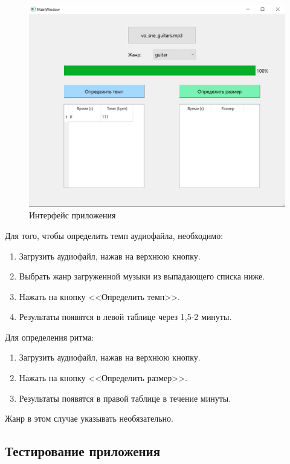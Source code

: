\begin{figure}[h]
	\centering
	\includegraphics[scale=0.6]{inc/img/gui.jpg}
	\caption{Интерфейс приложения}
	\label{img:gui}
\end{figure}

Для того, чтобы определить темп аудиофайла, необходимо:

\begin{enumerate}
	\item Загрузить аудиофайл, нажав на верхнюю кнопку.
	\item Выбрать жанр загруженной музыки из выпадающего списка ниже.
	\item Нажать на кнопку <<Определить темп>>.
	\item Результаты появятся в левой таблице через 1,5-2 минуты.
\end{enumerate}

Для определения ритма:

\begin{enumerate}
	\item Загрузить аудиофайл, нажав на верхнюю кнопку.
	\item Нажать на кнопку <<Определить размер>>.
	\item Результаты появятся в правой таблице в течение минуты.
\end{enumerate}

Жанр в этом случае указывать необязательно.


\subsection{Тестирование приложения}

